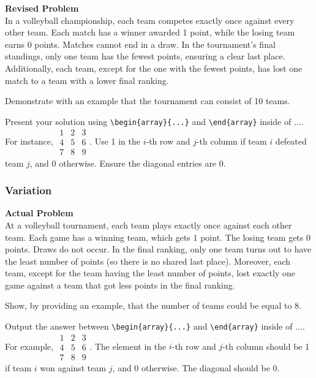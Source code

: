 \textbf{Revised Problem}\\
In a volleyball championship, each team competes exactly once against every other team. Each match has a winner awarded 1 point, while the losing team earns 0 points. Matches cannot end in a draw. In the tournament's final standings, only one team has the fewest points, ensuring a clear last place. Additionally, each team, except for the one with the fewest points, has lost one match to a team with a lower final ranking.

Demonstrate with an example that the tournament can consist of 10 teams.

Present your solution using \verb|\begin{array}{...}| and \verb|\end{array}| inside of $\boxed{...}$. For instance, $\boxed{\begin{array}{ccc}1 & 2 & 3 \\ 4 & 5 & 6 \\ 7 & 8 & 9\end{array}}$. Use 1 in the $i$-th row and $j$-th column if team $i$ defeated team $j$, and 0 otherwise. Ensure the diagonal entries are 0.

\subsubsection{Variation}
\textbf{Actual Problem}\\
At a volleyball tournament, each team plays exactly once against each other team. Each game has a winning team, which gets 1 point. The losing team gets 0 points. Draws do not occur. In the final ranking, only one team turns out to have the least number of points (so there is no shared last place). Moreover, each team, except for the team having the least number of points, lost exactly one game against a team that got less points in the final ranking.

Show, by providing an example, that the number of teams could be equal to 8.

Output the answer between \verb|\begin{array}{...}| and \verb|\end{array}| inside of $\boxed{...}$. For example, $\boxed{\begin{array}{ccc}1 & 2 & 3 \\ 4 & 5 & 6 \\ 7 & 8 & 9\end{array}}$.
The element in the $i$-th row and $j$-th column should be 1 if team $i$ won against team $j$, and 0 otherwise. The diagonal should be 0.


